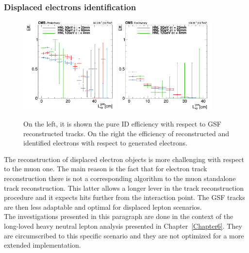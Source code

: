 \subsubsection{Displaced electrons
  identification}\label{sec:c2dispele}
\begin{figure}[h]
\centering
  \includegraphics[width=0.45\textwidth]{Figures/c2/_e_l2id_Lxy_eff.png}
  \includegraphics[width=0.45\textwidth]{Figures/c2/el_l2full_Lxy_eff.png}
  \caption{On the left, it is shown the pure ID efficiency with
    respect to GSF reconstructed tracks. On the right the efficiency
    of reconstructed and identified electrons with
    respect to generated electrons. \basile}
  \label{fig:basileele}
\end{figure}

The reconstruction of displaced electron objects is more challenging
with respect to the muon one. 
The main reason is the fact that for electron track reconstruction
there is not a corresponding algorithm to the muon standalone track
reconstruction. This latter allows a longer lever in the track
reconstruction procedure and it expects hits
further from the interaction point. The GSF tracks are then less
adaptable and optimal for displaced lepton scenarios.\\

The investigations presented in this paragraph are done in the context
of the long-loved heavy neutral lepton analysis presented in
Chapter~\ref{Chapter6}. They are circumscribed
to this specific scenario and they are not optimized for a more extended
implementation.  

